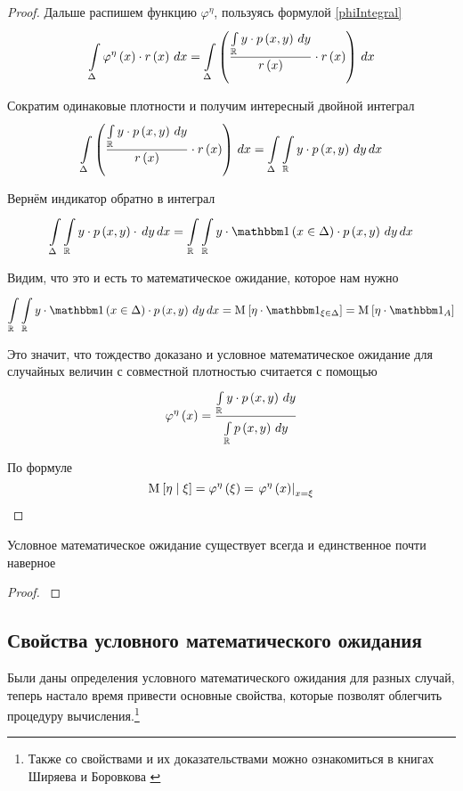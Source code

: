 \begin{proof}
Дальше распишем функцию $\varphi^{\eta}$,
пользуясь формулой \eqref{phiIntegral}
$$\integral{\Delta}{}{x}{
    \varphi^{\eta}\left( x \right) \cdot r\left( x \right)}
    = \integral{\Delta}{}{x}{\left(
        \frac{\integral{\mathbb{R}}{}{y}{y \cdot \pdf{x,y}}}
            {r\left( x \right)}
        \cdot r\left( x \right) \right)}$$

Сократим одинаковые плотности и получим интересный двойной интеграл
$$\integral{\Delta}{}{x}{\left(
        \frac{\integral{\mathbb{R}}{}{y}{y \cdot \pdf{x,y}}}
            {r\left( x \right)}
        \cdot r\left( x \right) \right)}
    = \integral{\Delta}{}{x}{
        \integral{\mathbb{R}}{}{y}{y \cdot \pdf{x,y}}}$$

Вернём индикатор обратно в интеграл
$$\integral{\Delta}{}{x}{
    \integral{\mathbb{R}}{}{y}{y \cdot \pdf{x,y} \cdot}}
    =\integral{\mathbb{R}}{}{x}{
        \integral{\mathbb{R}}{}{y}{y \cdot \indicator{x \in \Delta}
            \cdot \pdf{x,y}}}$$

Видим, что это и есть то математическое ожидание, которое нам нужно
$$\integral{\mathbb{R}}{}{x}{
    \integral{\mathbb{R}}{}{y}{y \cdot \indicator{x \in \Delta}
        \cdot \pdf{x,y}}}
    = \Mean{ \eta \cdot \indicatorof{\xi \in \Delta} }
    = \Mean{ \eta \cdot \indicatorof{A} }$$

Это значит, что тождество доказано и условное математическое ожидание
для случайных величин с совместной плотностью считается с помощью
$$\varphi^{\eta}\left( x \right)
    = \frac{\integral{\mathbb{R}}{}{y}{y \cdot \pdf{x,y}}}
                {\integral{\mathbb{R}}{}{y}{\pdf{x,y}}}$$

По формуле
$$\Mean{ \eta \mid \xi }
    = \varphi^{\eta}\left( \xi \right)
    = \left. \varphi^{\eta}\left( x \right) \right|_{x=\xi}$$
\end{proof}

\begin{theorem}
    Условное математическое ожидание существует всегда
    и единственное почти наверное
\end{theorem}
\begin{proof}
\cite[стр.~142]{BorovkovMS}
\end{proof}

\subsection{Свойства условного математического ожидания}
Были даны определения условного математического ожидания для разных случай,
теперь настало время привести основные свойства,
которые позволят облегчить процедуру вычисления.\footnote{Также
со свойствами и их доказательствами можно ознакомиться в книгах
Ширяева \cite[стр.~270]{Shiryayev1} и Боровкова \cite[стр.~143]{BorovkovMS}
}


